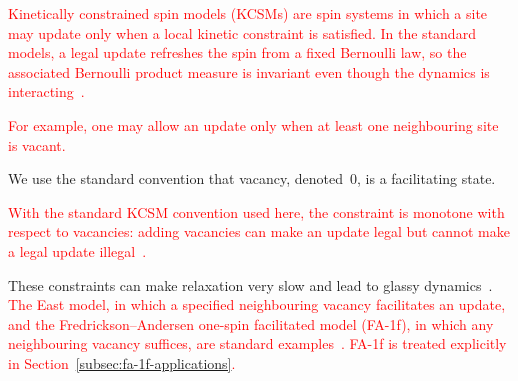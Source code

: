 
%
%
%
%

\textcolor{red}{Kinetically constrained spin models (KCSMs) are spin systems in
which a site may update only when a local kinetic constraint is satisfied. In
the standard models, a legal update refreshes the spin from a fixed Bernoulli
law, so the associated Bernoulli product measure is invariant even though the
dynamics is interacting~\cite{FredricksonAndersen1984,CancriniEtAl2008,HartarskyToninelli2025}.}


\textcolor{red}{For example, one may allow an update only when at least one
neighbouring site is vacant.}


We use
the standard convention that vacancy, denoted~$0$, is a facilitating state. 



\textcolor{red}{With the standard KCSM convention used here, the constraint is
monotone with respect to vacancies: adding vacancies can make an update legal
but cannot make a legal update
illegal~\cite{CancriniEtAl2008,HartarskyToninelli2025}.}



These constraints can make
relaxation very slow and lead to glassy
dynamics~\cite{CancriniEtAl2008,HartarskyToninelli2025}.
\textcolor{red}{The East model, in which a specified neighbouring vacancy
facilitates an update, and the Fredrickson--Andersen one-spin facilitated model
(FA-1f), in which any neighbouring vacancy suffices, are standard
examples~\cite{FredricksonAndersen1984,HartarskyToninelli2025}. FA-1f is
treated explicitly in Section~\ref{subsec:fa-1f-applications}.}

